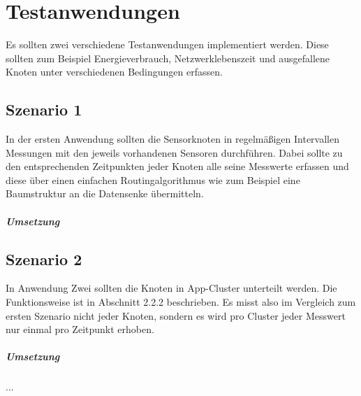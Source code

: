 \chapter{Testanwendungen}
Es sollten zwei verschiedene Testanwendungen implementiert werden. Diese sollten zum Beispiel Energieverbrauch, Netzwerklebenszeit und ausgefallene Knoten unter verschiedenen Bedingungen erfassen.\\
\section{Szenario 1}
In der ersten Anwendung sollten die Sensorknoten in regelmäßigen Intervallen Messungen mit den jeweils vorhandenen Sensoren durchführen. Dabei sollte zu den entsprechenden Zeitpunkten jeder Knoten alle seine Messwerte erfassen und diese über einen einfachen Routingalgorithmus wie zum Beispiel eine Baumstruktur an die Datensenke übermitteln.
\paragraph{Umsetzung}
\section{Szenario 2}
In Anwendung Zwei sollten die Knoten in App-Cluster unterteilt werden. Die Funktionsweise ist in Abschnitt 2.2.2 beschrieben. Es misst also im Vergleich zum ersten Szenario nicht jeder Knoten, sondern es wird pro Cluster jeder Messwert nur einmal pro Zeitpunkt erhoben.
\paragraph{Umsetzung}
...